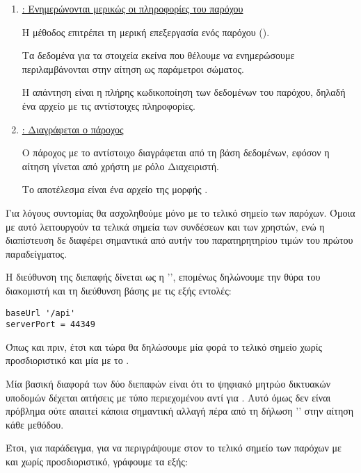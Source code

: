 \begin{itemize}
\begin{enumerate}
        \item \underline{\textbf{}: Ενημερώνονται μερικώς οι πληροφορίες του παρόχου}
        
        Η μέθοδος  επιτρέπει τη μερική επεξεργασία ενός παρόχου ().

        Τα δεδομένα για τα στοιχεία εκείνα που θέλουμε να ενημερώσουμε
        περιλαμβάνονται στην αίτηση ως παράμετροι σώματος.

        Η απάντηση είναι η πλήρης κωδικοποίηση των δεδομένων του παρόχου,
        δηλαδή ένα αρχείο  με τις αντίστοιχες πληροφορίες.

        \item \underline{\textbf{}: Διαγράφεται ο πάροχος}
        
        Ο πάροχος με το αντίστοιχο  διαγράφεται από τη βάση δεδομένων,
        εφόσον η αίτηση γίνεται από χρήστη με ρόλο Διαχειριστή.

        Το αποτέλεσμα είναι ένα αρχείο  της μορφής .
    \end{enumerate}
\end{itemize}

Για λόγους συντομίας θα ασχοληθούμε μόνο με το τελικό σημείο των παρόχων.
Όμοια με αυτό λειτουργούν τα τελικά σημεία των συνδέσεων και των χρηστών,
ενώ η διαπίστευση δε διαφέρει σημαντικά από αυτήν του παρατηρητηρίου τιμών του πρώτου παραδείγματος.

Η διεύθυνση της διεπαφής δίνεται ως η '',
επομένως δηλώνουμε την θύρα του διακομιστή και τη διεύθυνση βάσης με τις εξής εντολές:

\begin{lstlisting}[deletekeywords={api}]
baseUrl '/api'
serverPort = 44349
\end{lstlisting}

Όπως και πριν,
έτσι και τώρα θα δηλώσουμε μία φορά το τελικό σημείο χωρίς προσδιοριστικό 
και μία με το .

Μία βασική διαφορά των δύο διεπαφών είναι ότι το ψηφιακό μητρώο δικτυακών υποδομών
δέχεται αιτήσεις με τύπο περιεχομένου  αντί για .
Αυτό όμως δεν είναι πρόβλημα ούτε απαιτεί κάποια σημαντική αλλαγή πέρα από τη δήλωση '' 
στην αίτηση κάθε μεθόδου.

Έτσι, για παράδειγμα, 
για να περιγράψουμε στον  το τελικό σημείο των παρόχων με και χωρίς προσδιοριστικό,
γράφουμε τα εξής:

